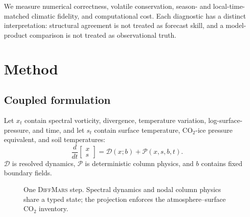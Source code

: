 \documentclass{article}
\newcommand{\model}{\textsc{DiffMars}}
\begin{document}
We measure numerical correctness, volatile conservation, season- and
local-time-matched climatic fidelity, and computational cost. Each diagnostic
has a distinct interpretation: structural agreement is not treated as forecast
skill, and a model-product comparison is not treated as observational truth.

\section{Method}

\subsection{Coupled formulation}
Let \(x_t\) contain spectral vorticity, divergence, temperature variation,
log-surface-pressure, and time, and let \(s_t\) contain surface temperature,
\(\mathrm{CO_2}\)-ice pressure equivalent, and soil temperatures:
\begin{equation}
\frac{d}{dt}\begin{bmatrix}x\\s\end{bmatrix}
=\mathcal D(x;b)+\mathcal P(x,s,b,t).
\label{eq:hybrid}
\end{equation}
\(\mathcal D\) is resolved dynamics, \(\mathcal P\) is deterministic column
physics, and \(b\) contains fixed boundary fields.

\begin{figure}[t]
\centering
{}
\caption{One \model{} step. Spectral dynamics and nodal column physics share a
typed state; the projection enforces the atmosphere--surface CO$_2$ inventory.}
\label{fig:architecture}
\end{figure}
\end{document}

